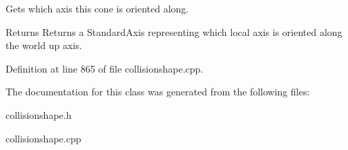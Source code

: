 Gets which axis this cone is oriented along. 

\begin{DoxyReturn}{Returns}
Returns a StandardAxis representing which local axis is oriented along the world up axis. 
\end{DoxyReturn}


Definition at line 865 of file collisionshape.cpp.



The documentation for this class was generated from the following files:\begin{DoxyCompactItemize}
\item 
collisionshape.h\item 
collisionshape.cpp\end{DoxyCompactItemize}
